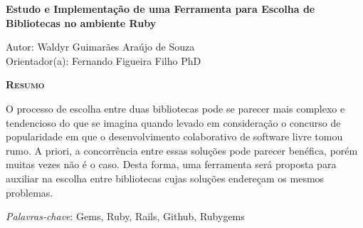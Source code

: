 \begin{center}
	{\Large{\textbf{Estudo e Implementação de uma Ferramenta para Escolha de Bibliotecas no ambiente Ruby}}}
\end{center}

\vspace{1cm}

\begin{flushright}
	Autor: Waldyr Guimarães Araújo de Souza\\
	Orientador(a): Fernando Figueira Filho PhD
\end{flushright}

\vspace{1cm}

\begin{center}
	\Large{\textsc{\textbf{Resumo}}}
\end{center}

\noindent O processo de escolha entre duas bibliotecas pode se parecer mais complexo e tendencioso do que se imagina quando levado em consideração o concurso de popularidade em que o desenvolvimento colaborativo de software livre tomou rumo. A priori, a concorrência entre essas soluções pode parecer benéfica, porém muitas vezes não é o caso. Desta forma, uma ferramenta será proposta para auxiliar na escolha entre bibliotecas cujas soluções endereçam os mesmos problemas.

\noindent\textit{Palavras-chave}: Gems, Ruby, Rails, Github, Rubygems